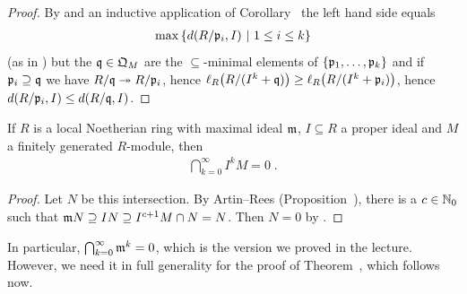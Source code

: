 \documentclass[a4paper,parskip=half,numbers=enddot, DIV=12]{scrreprt}
\begin{document}
\begin{proof}
    By  and an inductive application of Corollary~ the left hand side equals 
    \begin{align*}
        \max\left\{d(R/\mathfrak{p}_i,I)\ \middle|\  1 \leq i \leq k\right\}
    \end{align*}
    (as in ) but the $\mathfrak{q}\in \mathfrak{Q}_M$ are the $\subseteq$-minimal elements of $\left\{\mathfrak{p}_1,\ldots,\mathfrak{p}_k\right\}$ and if $\mathfrak{p}_i\supseteq \mathfrak{q}$ we have $R/\qq \epimorphism R/\pp_i$, hence $\ell_R\big(R/(I^k+\mathfrak{q})\big) \geq \ell_R\big(R/(I^k +\mathfrak{p}_i)\big)$, hence $d(R/\mathfrak{p}_i,I) \leq d(R/\mathfrak{q},I)$.
\end{proof}
\begin{cor}
    If $R$ is a local Noetherian ring with maximal ideal $\mathfrak{m}$, $I\subseteq R$ a proper ideal and $M$ a finitely generated $R$-module, then 
    \begin{align*}
        \bigcap_{k=0}^\infty I^kM =0\;.
    \end{align*}
\end{cor}
\begin{proof}
    Let $N$ be this intersection. By Artin--Rees (Proposition~), there is a $c\in\mathbb{N}_0$ such that $\mathfrak{m} N \supseteq IN\supseteq I^{c+1} M \cap N = N$. Then $N=0$ by \NAK.
\end{proof}
\begin{rem*}
	In particular, $\bigcap_{k=0}^\infty\mathfrak{m}^k=0$, which is the version we proved in the lecture. However, we need it in full generality for the proof of Theorem~, which follows now.
\end{rem*}
\end{document}
